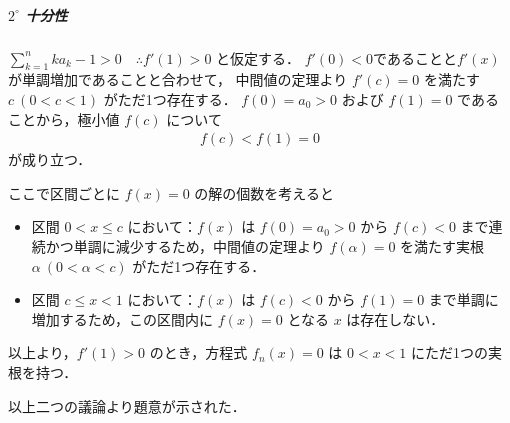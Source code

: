 \documentclass[../../main.tex]{subfiles}
\begin{document}
\subparagraph{$2^\circ$ 十分性}
$\sum_{k=1}^n k a_k - 1 > 0 \quad \therefore f'(1) > 0$ と仮定する．
$f'(0)<0$であることと$f'(x)$が単調増加であることと合わせて，
中間値の定理より $f'(c) = 0$ を満たす $c \ (0 < c < 1)$ がただ1つ存在する．
$f(0) = a_0 > 0$ および $f(1) = 0$ であることから，極小値 $f(c)$ について
\begin{align}
  f(c) < f(1) = 0
\end{align}
が成り立つ．

ここで区間ごとに $f(x) = 0$ の解の個数を考えると
\begin{itemize}
  \item 区間 $0 < x \le c$ において：$f(x)$ は $f(0) = a_0 > 0$ から $f(c) < 0$ まで連続かつ単調に減少するため，中間値の定理より $f(\alpha) = 0$ を満たす実根 $\alpha \ (0 < \alpha < c)$ がただ1つ存在する．
  \item 区間 $c \le x < 1$ において：$f(x)$ は $f(c) < 0$ から $f(1) = 0$ まで単調に増加するため，この区間内に $f(x) = 0$ となる $x$ は存在しない．
\end{itemize}

以上より，$f'(1) > 0$ のとき，方程式 $f_n(x) = 0$ は $0 < x < 1$ にただ1つの実根を持つ．
\casesend[O]

以上二つの議論より題意が示された．
\end{document}
